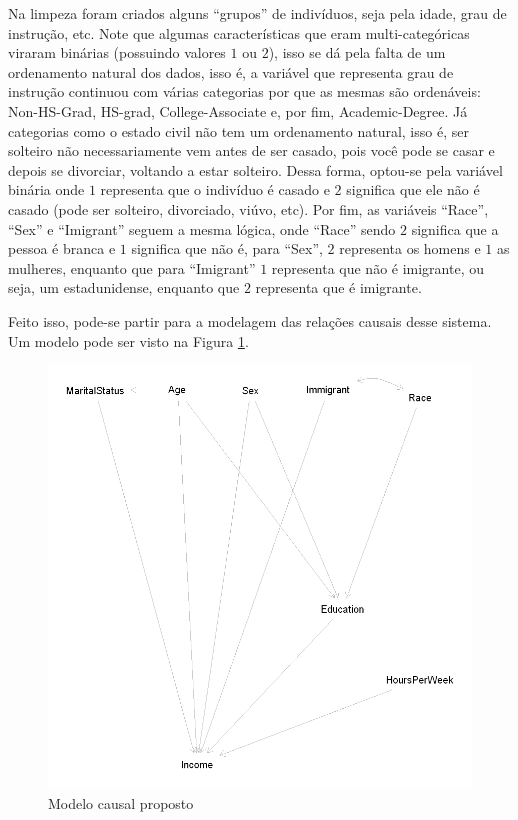 \documentclass[11pt,letterpaper,twocolumn]{article}
\begin{document}
Na limpeza foram criados alguns ``grupos'' de indivíduos, seja pela idade, grau de instrução, etc. Note que algumas características que eram multi-categóricas viraram binárias (possuindo valores $1$ ou $2$), isso se dá pela falta de um ordenamento natural dos dados, isso é, a variável que representa grau de instrução continuou com várias categorias por que as mesmas são ordenáveis: Non-HS-Grad, HS-grad, College-Associate e, por fim, Academic-Degree. Já categorias como o estado civil não tem um ordenamento natural, isso é, ser solteiro não necessariamente vem antes de ser casado, pois você pode se casar e depois se divorciar, voltando a estar solteiro. Dessa forma, optou-se pela variável binária onde $1$ representa que o indivíduo é casado e $2$ significa que ele não é casado (pode ser solteiro, divorciado, viúvo, etc). Por fim, as variáveis ``Race'', ``Sex'' e ``Imigrant'' seguem a mesma lógica, onde ``Race'' sendo $2$ significa que a pessoa é branca e $1$ significa que não é, para ``Sex'', $2$ representa os homens e $1$ as mulheres, enquanto que para ``Imigrant'' $1$ representa que não é imigrante, ou seja, um estadunidense, enquanto que $2$ representa que é imigrante.

Feito isso, pode-se partir para a modelagem das relações causais desse sistema. Um modelo pode ser visto na Figura \ref{model1}.
\begin{figure}
    \centering
    \includegraphics[scale = 0.5]{A2/Imagens/model1.png}
    \caption{Modelo causal proposto}
    \label{model1}
\end{figure}
\end{document}
